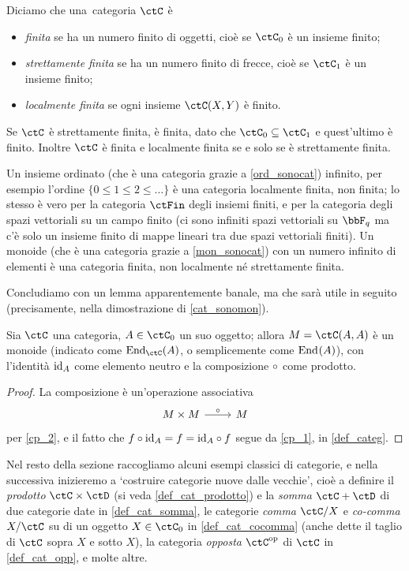 \begin{definition}\label{cat_finita_locfinita}
	Diciamo che una~categoria \(\ctC\) è
	\begin{itemize}
		\item \emph{finita} se ha un numero finito di oggetti, cioè se \(\ctC_0\) è un insieme finito;
		\item \emph{strettamente finita} se ha un numero finito di frecce, cioè se \(\ctC_1\) è un insieme finito;
		\item \emph{localmente finita} se ogni insieme \(\Hom\ctC(X,Y)\) è finito.
	\end{itemize}
	Se \(\ctC\) è strettamente finita, è finita, dato che \(\ctC_0\subseteq\ctC_1\) e quest'ultimo è finito. Inoltre \(\ctC\) è finita e localmente finita se e solo se è strettamente finita.

	Un insieme ordinato (che è una categoria grazie a \ref{ord_sonocat}) infinito, per esempio l'ordine \(\{0\le 1 \le 2 \le\dots\}\) è una categoria localmente finita, non finita; lo stesso è vero per la categoria \(\ctFin\) degli insiemi finiti, e per la categoria degli spazi vettoriali su un campo finito (ci sono infiniti spazi vettoriali su \(\bbF_q\) ma c'è solo un insieme finito di mappe lineari tra due spazi vettoriali finiti). Un monoide (che è una categoria grazie a \ref{mon_sonocat}) con un numero infinito di elementi è una categoria finita, non localmente né strettamente finita.
\end{definition}
Concludiamo con un lemma apparentemente banale, ma che sarà utile in seguito (precisamente, nella dimostrazione di \ref{cat_sonomon}).
\begin{lemma}\label{lem_end_monoide}
	Sia \(\ctC\) una categoria, \(A\in\ctC_0\) un suo oggetto; allora \(M=\Hom{\ctC}(A,A)\) è un monoide (indicato come \(\End[\ctC]{A}\), o semplicemente come \(\mathrm{End}_{}(A)\)), con l'identità \(\mathrm{id}_A\) come elemento neutro e la composizione \(\circ\) come prodotto.
\end{lemma}
\begin{proof}
	La composizione è un'operazione associativa
	\[\begin{tikzcd}
			M\times M \ar[r, "\cmp"] & M
		\end{tikzcd}\]
	per \ref{cp_2}, e il fatto che \(f\circ \mathrm{id}_A=f=\mathrm{id}_A\circ f\) segue da \ref{cp_1}, in \ref{def_categ}.
\end{proof}
Nel resto della sezione raccogliamo alcuni esempi classici di categorie, e nella successiva inizieremo a `costruire categorie nuove dalle vecchie', cioè a definire il \emph{prodotto} \(\ctC\times\ctD\) (si veda \ref{def_cat_prodotto}) e la \emph{somma} \(\ctC+\ctD\) di due categorie date in \ref{def_cat_somma}, le categorie \emph{comma} \(\ctC/X\) e \emph{co-comma} \(X/\ctC\) su di un oggetto \(X\in\ctC_0\) in \ref{def_cat_cocomma} (anche dette il taglio di \(\ctC\) sopra \(X\) e sotto \(X\)), la categoria \emph{opposta} \(\ctC^\op\) di \(\ctC\) in \ref{def_cat_opp}, e molte altre.

